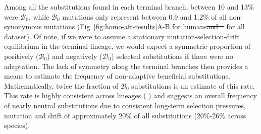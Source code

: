 \documentclass[10pt,letterpaper]{article}
\newcommand{\SphyDel}{\mathcal{D}_0}
\newcommand{\SphyBen}{\mathcal{B}_0}
\providecommand{\DIFaddtex}[1]{{\protect\color{blue}\uwave{#1}}} %
\providecommand{\DIFdeltex}[1]{{\protect\color{red}\sout{#1}}}                      %
\providecommand{\DIFaddbegin}{} %
\providecommand{\DIFaddend}{} %
\providecommand{\DIFdelbegin}{} %
\providecommand{\DIFdelend}{} %
\providecommand{\DIFadd}[1]{\texorpdfstring{\DIFaddtex{#1}}{#1}} %
\providecommand{\DIFdel}[1]{\texorpdfstring{\DIFdeltex{#1}}{}} %
\newcommand{\DIFscaledelfig}{0.5}
\newlength{\DIFdelgraphicswidth} %
\newlength{\DIFdelgraphicsheight} %
\newcommand{\DIFaddincludegraphics}[2][]{{\color{blue}\fbox{\DIFOincludegraphics[#1]{#2}}}} %
\newcommand{\DIFdelincludegraphics}[2][]{%
\sbox{\DIFdelgraphicsbox}{\DIFOincludegraphics[#1]{#2}}%
\settoboxwidth{\DIFdelgraphicswidth}{\DIFdelgraphicsbox} %
\settoboxtotalheight{\DIFdelgraphicsheight}{\DIFdelgraphicsbox} %
\scalebox{\DIFscaledelfig}{%
\parbox[b]{\DIFdelgraphicswidth}{\usebox{\DIFdelgraphicsbox}\\[-\baselineskip] \rule{\DIFdelgraphicswidth}{0em}}\llap{\resizebox{\DIFdelgraphicswidth}{\DIFdelgraphicsheight}{%
\setlength{\unitlength}{\DIFdelgraphicswidth}%
\begin{picture}(1,1)%
\thicklines\linethickness{2pt} %
{\color[rgb]{1,0,0}\put(0,0){\framebox(1,1){}}}%
{\color[rgb]{1,0,0}\put(0,0){\line( 1,1){1}}}%
{\color[rgb]{1,0,0}\put(0,1){\line(1,-1){1}}}%
\end{picture}%
}\hspace*{3pt}}} %
} %
\DeclareRobustCommand{\DIFaddbegin}{\DIFOaddbegin \let\includegraphics\DIFaddincludegraphics} %
\DeclareRobustCommand{\DIFaddend}{\DIFOaddend \let\includegraphics\DIFOincludegraphics} %
\DeclareRobustCommand{\DIFdelbegin}{\DIFOdelbegin \let\includegraphics\DIFdelincludegraphics} %
\DeclareRobustCommand{\DIFdelend}{\DIFOaddend \let\includegraphics\DIFOincludegraphics} %
\begin{document}
Among all the substitutions found in each terminal branch, between 10 and 13\% were $\SphyBen$, while $\SphyBen$ mutations only represent between 0.9 and 1.2\% of all non-synonymous mutations (Fig~\ref{fig:homo-afr-results}A-B for humans\DIFdelbegin \DIFdel{and ~}%
\DIFdelend \DIFaddbegin \DIFadd{, Table~A in~} \DIFaddend for all dataset).
Of note, if we were to assume a stationary mutation-selection-drift equilibrium in the terminal lineage, we would expect a symmetric proportion of positively ($\SphyBen$) and negatively ($\SphyDel$) selected substitutions if there were no adaptation.
The lack of symmetry along the terminal branches then provides a means to estimate the frequency of non-adaptive beneficial substitutions.
Mathematically, twice the fraction of $\SphyBen$ substitutions is an estimate of this rate.
This rate is highly consistent across lineages (\DIFdelbegin %
\DIFdelend \DIFaddbegin \DIFadd{Table~A in~}\DIFaddend ) and suggests an overall frequency of nearly neutral substitutions due to consistent long-term selection pressures, mutation and drift of approximately 20\% of all substitutions (20\%-26\% across species).
\end{document}
